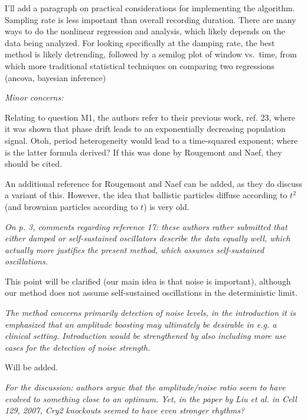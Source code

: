 \documentclass[11pt, letterpaper]{article}
\newenvironment{reviewer}{\itshape\color{gray}}{}
\begin{document}
I'll add a paragraph on practical considerations for implementing the algorithm. Sampling rate is less important than overall recording duration. There are many ways to do the nonlinear regression and analysis, which likely depends on the data being analyzed. For looking specifically at the damping rate, the best method is likely detrending, followed by a semilog plot of window vs.\ time, from which more traditional statistical techniques on comparing two regressions (ancova, bayesian inference)


\begin{reviewer}
Minor concerns:

Relating to question M1, the authors refer to their previous work, ref. 23, where it was shown that phase drift leads to an exponentially decreasing population signal. Otoh, period heterogeneity would lead to a time-squared exponent; where is the latter formula derived? If this was done by Rougemont and Naef, they should be cited.
\end{reviewer}

An additional reference for Rougemont and Naef can be added, as they do discuss a variant of this. However, the idea that ballistic particles diffuse according to $t^2$ (and brownian particles according to $t$) is very old.

\begin{reviewer}
On p. 3, comments regarding reference 17: these authors rather submitted that either damped or self-sustained oscillators describe the data equally well, which actually more justifies the present method, which assumes self-sustained oscillations.
\end{reviewer}

This point will be clarified (our main idea is that noise is important), although our method does not assume self-sustained oscillations in the deterministic limit.

\begin{reviewer}
The method concerns primarily detection of noise levels, in the introduction it is emphasized that an amplitude boosting may ultimately be desirable in e.g. a clinical setting. Introduction would be strengthened by also including more use cases for the detection of noise strength.
\end{reviewer}

Will be added.

\begin{reviewer}
For the discussion: authors argue that the amplitude/noise ratio seem to have evolved to something close to an optimum. Yet, in the paper by Liu et al. in Cell 129, 2007, Cry2 knockouts seemed to have even stronger rhythms?
\end{reviewer}
\end{document}
